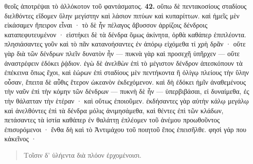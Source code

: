 \documentclass[a4paper, 11pt, oneside, polutonikogreek, german]{article}
\begin{document}
θεοῖς ἀποτρέψαι τὸ ἀλλόκοτον τοῦ φαντάσματος. \textbf{42.} οὔπω δὲ πεντακοσίους σταδίους διελθόντες εἴδομεν ὕλην μεγίστην καὶ λάσιον πιτύων καὶ κυπαρίττων. καὶ ἡμεῖς μὲν εἰκάσαμεν ἤπειρον εἶναι · τὸ δὲ ἦν πέλαγος ἄβυσσον ἀρρίζοις δένδροις καταπεφυτευμένον · εἱστήκει δὲ τὰ δένδρα ὅμως ἀκίνητα, ὀρθὰ καθάπερ ἐπιπλέοντα. πλησιάσαντες γοῦν καὶ τὸ πᾶν κατανοήσαντες ἐν ἀπόρῳ εἰχόμεθα τί χρὴ δρᾶν · οὔτε γὰρ διὰ τῶν δένδρων πλεῖν δυνατὸν ἦν --- πυκνὰ γὰρ καὶ προσεχῆ ὑπῆρχεν --- οὔτε ἀναστρέφειν ἐδόκει ῥᾴδιον. ἐγὼ δὲ ἀνελθὼν ἐπὶ τὸ μέγιστον δένδρον ἀπεσκόπουν τὰ ἐπέκεινα ὅπως ἔχοι, καὶ ἑώρων ἐπὶ σταδίους μὲν πεντήκοντα ἢ ὀλίγῳ πλείους τὴν ὕλην οὖσαν, ἔπειτα δὲ αὖθις ἕτερον ὠκεανὸν ἐκδεχόμενον. καὶ δὴ ἐδόκει ἡμῖν ἀναθεμένους τὴν ναῦν ἐπὶ τὴν κόμην τῶν δένδρων --- πυκνὴ δὲ ἦν --- ὑπερβιβάσαι, εἰ δυναίμεθα, ἐς τὴν θάλατταν τὴν ἑτέραν · καὶ οὕτως ἐποιοῦμεν. ἐκδήσαντες γὰρ αὐτὴν κάλῳ μεγάλῳ καὶ ἀνελθόντες ἐπὶ τὰ δένδρα μόλις ἀνιμησάμεθα, καὶ θέντες ἐπὶ τῶν κλάδων, πετάσαντες τὰ ἱστία καθάπερ ἐν θαλάττῃ ἐπλέομεν τοῦ ἀνέμου προωθοῦντος ἐπισυρόμενοι · ἔνθα δὴ καὶ τὸ Ἀντιμάχου τοῦ ποιητοῦ ἔπος ἐπεισῆλθε. φησὶ γάρ που κἀκεῖνος ·
\begin{quotation}
Τοῖσιν δ' ὑλήεντα διὰ πλόον ἐρχομένοισι.
\end{quotation}
\end{document}
